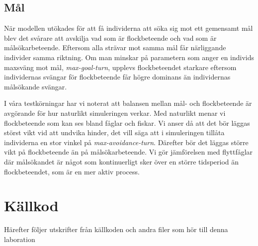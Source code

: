 \documentclass[titlepage, a4paper, 12pt]{article}
\begin{document}
\subsection{Mål}
När modellen utökades för att få individerna att söka sig mot ett
gemensamt mål blev det svårare att avskilja vad som är flockbeteende
och vad som är målsökarbeteende. Eftersom alla strävar mot samma mål
får närliggande individer samma riktning. Om man minskar på parametern
som anger en individs maxsväng mot mål, \textit{max-goal-turn},
upplevs flockbeteendet starkare eftersom individernas svängar för
flockbeteende får högre dominans än individernas målsökande svängar.

I våra testkörningar har vi noterat att balansen mellan mål- och
flockbeteende är avgörande för hur naturlikt simuleringen verkar. Med
naturlikt menar vi flockbeteende som kan ses bland fåglar och
fiskar. Vi anser då att det bör läggas störst vikt vid att undvika
hinder, det vill säga att i simuleringen tillåta individerna en stor
vinkel på \textit{max-avoidance-turn}. Därefter bör det läggas större
vikt på flockbeteende än på målsökarbeteende. Vi gör jämförelsen med
flyttfåglar där målsökandet är något som kontinuerligt sker över en
större tidsperiod än flockbeteendet, som är en mer aktiv process.


\newpage
\appendix
{}
\section{Källkod}\label{sec:kallkod}
Härefter följer utskrifter från källkoden och andra filer som hör till
denna laboration
\end{document}
